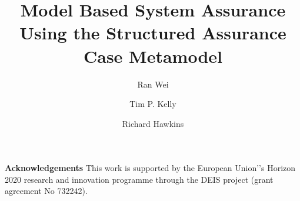 \documentclass[runningheads,a4paper]{llncs}
\begin{document}
 
 
\title{\textbf{Model Based System Assurance Using the Structured Assurance Case Metamodel}}
\author{Ran Wei \and Tim P. Kelly \and Richard Hawkins}
\maketitle


















\noindent\textbf{Acknowledgements}
This work is supported by the European Union'’s Horizon 2020 research and innovation programme through the DEIS project (grant agreement No 732242). 

 
  
\end{document}
